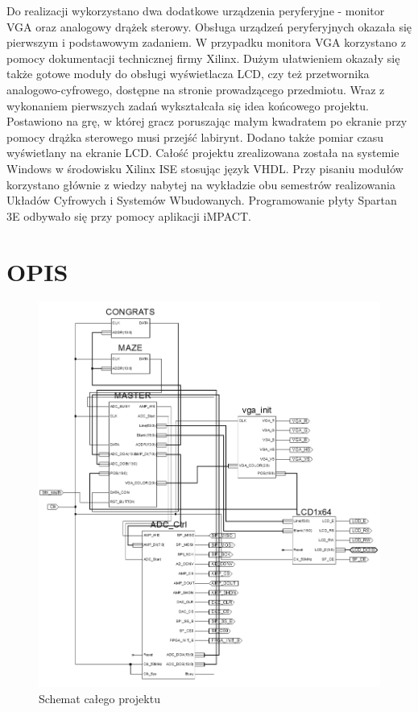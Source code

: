 \documentclass[11pt]{article}
\begin{document}
Do realizacji wykorzystano dwa dodatkowe urządzenia peryferyjne - monitor VGA oraz analogowy drążek sterowy.
Obsługa urządzeń peryferyjnych okazała się pierwszym i podstawowym zadaniem. 
W przypadku monitora VGA korzystano z pomocy dokumentacji technicznej firmy Xilinx\cite{pa}.
Dużym ułatwieniem okazały się także gotowe moduły do obsługi wyświetlacza LCD, czy też przetwornika analogowo-cyfrowego, dostępne na stronie prowadzącego przedmiotu\cite{pb}.
Wraz z wykonaniem pierwszych zadań wykształcała się idea końcowego projektu.
Postawiono na grę, w której gracz poruszając małym kwadratem po ekranie przy pomocy drążka sterowego musi przejść labirynt.
Dodano także pomiar czasu wyświetlany na ekranie LCD.
Całość projektu zrealizowana została na systemie Windows w środowisku Xilinx ISE stosując język VHDL.
Przy pisaniu modułów korzystano głównie z wiedzy nabytej na wykładzie obu semestrów realizowania Układów Cyfrowych i Systemów Wbudowanych\cite{pc}.
Programowanie płyty Spartan 3E odbywało się przy pomocy aplikacji iMPACT.
\section{OPIS}

\begin{figure}[H]
\center
\includegraphics[scale=.6]{schemat.png}
\caption{Schemat całego projektu}
\end{figure}
\end{document}
